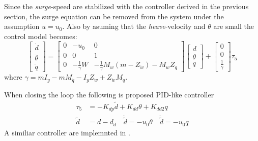 		Since the \textit{surge}-speed are stabilized with the controller derived in the previous
		section, the surge equation can be removed from the system under the assumption $u = u_0$.		
		Also by asuming that the \textit{heave}-velocity and $\theta$ are small the control model
		becomes:
		\begin{equation}
			\left [ \begin{matrix}
					\dot{d} \\
					\dot{\theta} \\
					\dot{q} 
				\end{matrix}
				\right ] = \left [ \begin{matrix}
							0 & -u_0 &  0 \\
							0 & 0 &   1 \\
							0 & -\frac{1}{\gamma} W &-\frac{1}{\gamma}M_{w} 
							(m - Z_{\dot{w}})-M_w Z_q
						\end{matrix} \right ] 
				\left [ \begin{matrix}
						d \\
						\theta \\
						q
					\end{matrix} \right] + \left [ \begin{matrix}
										0 \\
										0 \\
										\frac{1}{\gamma}
									\end{matrix} \right] \tau_5
		\end{equation}
		where $\gamma = m I_y - m M_{\dot{q}} - I_y Z_{\dot{w}} + Z_{\dot{w}} M_{\dot{q}}$.
		
		When closing the loop the following is proposed PID-like controller
		\begin{equation}
			\begin{aligned}
				\tau_5 &= -K_{dp} \tilde{d} + K_{dd}  \theta + K_{dd2} q \\
				\tilde{d} &= d - d_d \quad \dot{\tilde{d}} = -u_0\theta \quad
				\ddot{\tilde{d}} = -u_0q
			\end{aligned}
		\end{equation}
		A similiar controller are implemnted in \cite{NDRE-AUV}.
				

	
